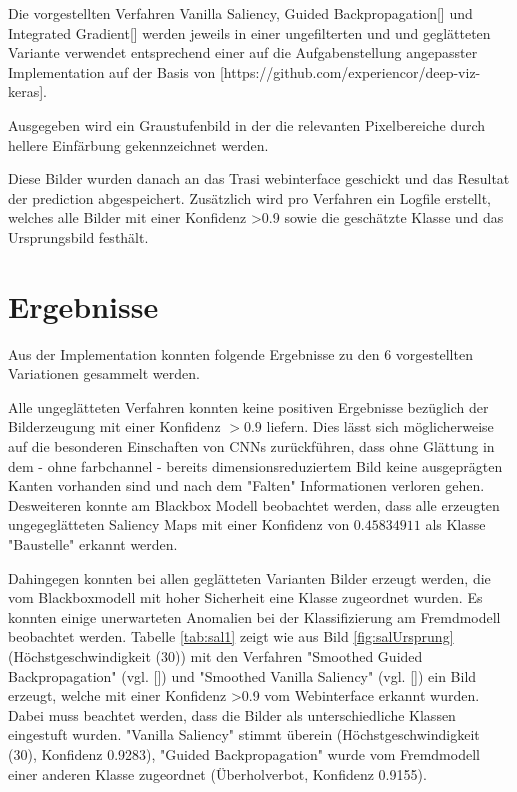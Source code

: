 Die vorgestellten Verfahren Vanilla Saliency\cite{simonyan_deep_2013}, Guided Backpropagation[] und Integrated Gradient[] werden jeweils in einer ungefilterten und und geglätteten Variante verwendet entsprechend einer auf die Aufgabenstellung angepasster Implementation auf der Basis von [https://github.com/experiencor/deep-viz-keras]. 

Ausgegeben wird ein Graustufenbild in der die relevanten Pixelbereiche durch hellere Einfärbung gekennzeichnet werden.

Diese Bilder wurden danach an das Trasi webinterface geschickt und das Resultat der prediction abgespeichert. Zusätzlich wird pro Verfahren ein Logfile erstellt, welches alle Bilder mit einer Konfidenz >0.9 sowie die geschätzte Klasse und das Ursprungsbild festhält.
%
%
%
%


\section{Ergebnisse}

Aus der Implementation konnten folgende Ergebnisse zu den 6 vorgestellten Variationen gesammelt werden. 

Alle ungeglätteten Verfahren konnten keine positiven Ergebnisse bezüglich der Bilderzeugung mit einer Konfidenz $> 0.9$ liefern. Dies lässt sich möglicherweise auf die besonderen Einschaften von CNNs zurückführen, dass ohne Glättung in dem - ohne farbchannel - bereits dimensionsreduziertem Bild keine ausgeprägten Kanten vorhanden sind und nach dem "Falten" Informationen verloren gehen. Desweiteren konnte am Blackbox Modell beobachtet werden, dass alle erzeugten ungegeglätteten Saliency Maps mit einer Konfidenz von $0.45834911$ als Klasse "Baustelle" erkannt werden.

Dahingegen konnten bei allen geglätteten Varianten Bilder erzeugt werden, die vom Blackboxmodell mit hoher Sicherheit eine Klasse zugeordnet wurden. Es konnten einige unerwarteten Anomalien bei der Klassifizierung am Fremdmodell beobachtet werden.  Tabelle \ref{tab:sal1} zeigt wie aus Bild \ref{fig:salUrsprung} (Höchstgeschwindigkeit (30))  mit den Verfahren "Smoothed Guided Backpropagation" (vgl. []) und "Smoothed Vanilla Saliency" (vgl. []) ein Bild erzeugt, welche mit einer Konfidenz >0.9 vom Webinterface erkannt wurden. Dabei muss beachtet werden, dass die Bilder als unterschiedliche Klassen eingestuft wurden. "Vanilla Saliency" stimmt überein (Höchstgeschwindigkeit (30), Konfidenz 0.9283), "Guided Backpropagation" wurde vom Fremdmodell einer anderen Klasse zugeordnet (Überholverbot, Konfidenz 0.9155).

